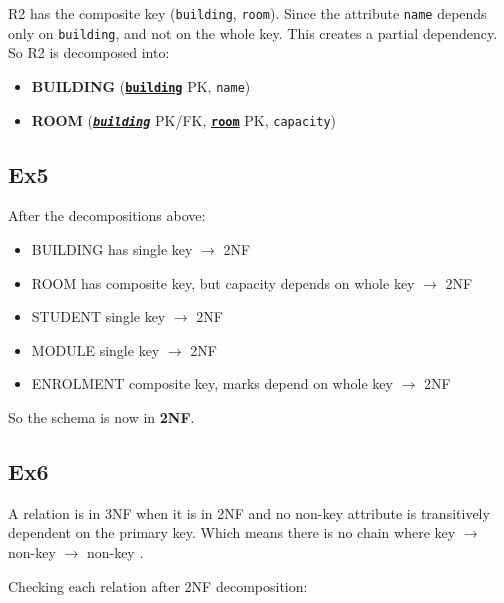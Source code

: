 \documentclass[12pt, a4paper]{report}
\begin{document}
R2 has the composite key (\texttt{building}, \texttt{room}). Since the attribute \texttt{name} depends only on \texttt{building}, and not on the whole key. This creates a partial dependency. So R2 is decomposed into:

\begin{itemize}
    \item \textbf{BUILDING} (\textbf{\underline{\texttt{building}}} PK, \texttt{name})
    \item \textbf{ROOM} (\textbf{\underline{\textit{\texttt{building}}}} PK/FK, \textbf{\underline{\texttt{room}}} PK, \texttt{capacity})
\end{itemize}







\subsection{Ex5}

After the decompositions above:

\begin{itemize}
    \item BUILDING has single key $\rightarrow$ 2NF
    \item ROOM has composite key, but capacity depends on whole key $\rightarrow$ 2NF
    \item STUDENT single key $\rightarrow$ 2NF
    \item MODULE single key $\rightarrow$ 2NF
    \item ENROLMENT composite key, marks depend on whole key $\rightarrow$ 2NF
\end{itemize}

So the schema is now in \textbf{2NF}.











\subsection{Ex6}

A relation is in 3NF when it is in 2NF and no non-key attribute is transitively dependent on the primary key. Which means there is no chain where key $\rightarrow$ non-key $\rightarrow$ non-key \cite{geeksforgeeks_3nf}.

Checking each relation after 2NF decomposition:
\end{document}
